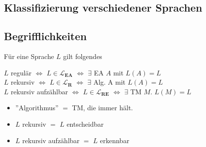 \documentclass[a4paper, 11pt]{article}
\begin{document}
                \subsection{Klassifizierung verschiedener Sprachen}
            
            
            
                \subsection{Begrifflichkeiten}

                Für eine Sprache $L$ gilt folgendes
                \begin{center}
                    $L$ regulär $\iff $ $L \in \mathbf{\mathcal{L}_{\textbf{EA}}}$ $\iff$ $\exists$ EA $A$ mit $L(A) = L$\\
                    $L$ rekursiv $\iff$ $L \in \mathbf{\mathcal{L}_{\textbf{R}}}$ $\iff$ $\exists$ Alg. A mit $L(A) = L$\\
                    $L$ rekursiv aufzählbar $\iff$ $L \in \mathbf{\mathcal{L}_{\textbf{RE}}}$ $\iff$ $\exists$ TM $M$. $L(M) = L$
                \end{center}
                \begin{itemize}
                    \item  ''Algorithmus'' $=$ TM, die immer hält.
                    \item $L$ rekursiv $=$ $L$ entscheidbar
                    \item $L$ rekursiv aufzählbar $=$ $L$ erkennbar
                \end{itemize}
               
\end{document}
